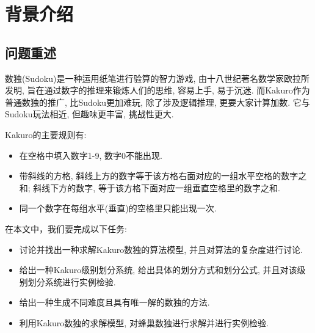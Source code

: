 
\section{背景介绍}
    \subsection{问题重述}
        数独(Sudoku)是一种运用纸笔进行验算的智力游戏\citep{Baidu_Sudoku},
        由十八世纪著名数学家欧拉所发明,
        旨在通过数字的推理来锻炼人们的思维, 容易上手, 易于沉迷.
        而Kakuro作为普通数独的推广, 比Sudoku更加难玩,
        除了涉及逻辑推理, 更要大家计算加数\citep{Baidu_Kakuro}.
        它与Sudoku玩法相近, 但趣味更丰富, 挑战性更大.

        Kakuro的主要规则有:
        \begin{itemize}
            \item 在空格中填入数字1-9, 数字0不能出现.
            \item 带斜线的方格, 斜线上方的数字等于该方格右面对应的一组水平空格的数字之和;
                    斜线下方的数字, 等于该方格下面对应一组垂直空格里的数字之和.
            \item 同一个数字在每组水平(垂直)的空格里只能出现一次.
        \end{itemize}

        在本文中，我们要完成以下任务:
        \begin{itemize}
            \item 讨论并找出一种求解Kakuro数独的算法模型, 并且对算法的复杂度进行讨论.
            \item 给出一种Kakuro级别划分系统, 给出具体的划分方式和划分公式,
                    并且对该级别划分系统进行实例检验.
            \item 给出一种生成不同难度且具有唯一解的数独的方法.
            \item 利用Kakuro数独的求解模型, 对蜂巢数独进行求解并进行实例检验.
        \end{itemize}

